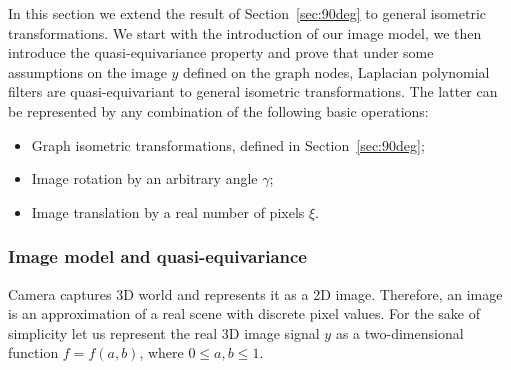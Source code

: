 \documentclass[10pt,journal,compsoc]{IEEEtran}
\begin{document}
	In this section we extend the result of Section~\ref{sec:90deg} to general isometric transformations. We start with the introduction of our image model, we then introduce the quasi-equivariance property and prove that under some assumptions on the  image $y$ defined on the graph nodes, Laplacian polynomial filters are quasi-equivariant to general isometric transformations. The latter 
	can be represented by any combination of the following basic operations:
	\begin{itemize}
		\setlength\itemsep{0pt}
		\setlength{\parskip}{0pt}
		\item Graph isometric transformations, defined in Section~\ref{sec:90deg};
		\item Image rotation by an arbitrary angle $\gamma$;
		\item Image translation by a real number of pixels $\xi$.
	\end{itemize}
	
	\subsubsection{Image model and quasi-equivariance}
	
	Camera captures 3D world and represents it as a 2D image. Therefore, an image is an approximation of a real scene with discrete pixel values. For the sake of simplicity let us represent the real 3D image signal $y$ as a two-dimensional function $f = f(a,b)$, where $0 \leq a,b \leq 1$.  
	
\end{document}
